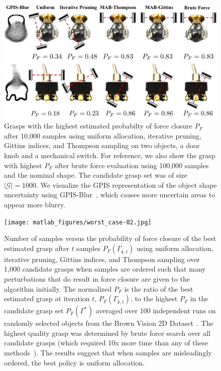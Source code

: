 \documentclass[10pt, conference]{ieeeconf}      %
\newcommand{\mG}{\mathcal{G}}
\begin{document}
\begin{figure}%
\label{fig:shape_examples}
    \centering
    \includegraphics[width=16.5cm]{figures/shapes.jpg}%
    \caption{Grasps with the highest estimated probabilty of force closure $P_F$ after 10,000 samples using uniform allocation, iterative pruning, Gittins indices, and Thompson sampling on two objects, a door knob and a mechanical switch. For reference, we also show the grasp with highest $P_F$ after brute force evaluation using 100,000 samples and the nominal shape. The candidate grasp set was of size $|\mG|=1000$. We visualize the GPIS representation of the object shape uncertainty using GPIS-Blur~\cite{mahler2015gp}, which causes more uncertain areas to appear more blurry.}%
    \label{fig:shape_samples}%
\end{figure}

\begin{figure}[ht!]
\centering
\texttt{[image: matlab\_figures/worst\_case-02.jpg]}
\caption{ \footnotesize 
	Number of samples versus the probability of force closure of the best estimated grasp after $t$ samples $P_F(\Gamma_{\bar{k}, t})$ using uniform allocation, iterative pruning, Gittins indices, and Thompson sampling over 1,000 candidate grasps when samples are ordered such that many perturbations that do result in force closure are given to the algorithm initially.
	The normalized $P_F$ is the ratio of the best estimated grasp at iteration $t$, $P_F(\Gamma_{\bar{k}, t})$, to the highest $P_F$ in the candidate grasp set $P_F(\Gamma^*)$ averaged over 100 independent runs on randomly selected objects from the Brown Vision 2D Dataset~\cite{brown}.
 	The highest quality grasp was determined by brute force search over all candidate grasps (which required 10x  more time than any of these methods~\cite{kehoe2012toward}).
 	The results suggest that when samples are misleadingly ordered, the best policy is uniform allocation.}
\vspace*{-10pt}
\label{fig:worst_case}
\end{figure}
\end{document}
